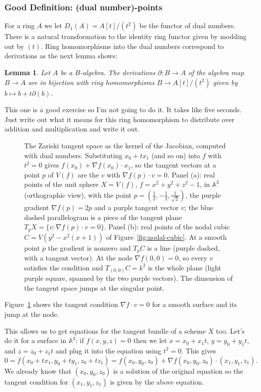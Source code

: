 \documentclass[12pt]{article}
\numberwithin{equation}{section}
\newtheorem{lemma}[theorem]{Lemma}
\theoremstyle{definition}
\theoremstyle{remark}
\renewcommand{\AA}{\mathbb{A}}
\begin{document}
\subsubsection{Good Definition: (dual number)-points}
For a ring $A$ we let $D_1(A) = A[t]/(t^2)$ be the functor of dual numbers. 
There is a natural transformation to the identity ring functor given by modding out by $(t)$. 
Ring homomorphisms into the dual numbers correspond to derivations as the next lemma shows:
\begin{lemma}
	Let $A$ be a $B$-algebra. 
	The derivations $\partial: B \to A$ of the algebra map $B \to A$ are in bijection with ring homomorphisms $B\to A[t]/(t^2)$ given by $b\mapsto b + t\partial(b)$.  
\end{lemma}
This one is a good exercise so I'm not going to do it. 
It takes like five seconds. 
Just write out what it means for this ring homomorphism to distribute over addition and multiplication and write it out.

\begin{figure}[H]
\centering

\caption{The Zariski tangent space as the kernel of the Jacobian, computed with dual numbers. Substituting $x_0+tx_1$ (and so on) into $f$ with $t^2=0$ gives $f(x_0)+\nabla f(x_0)\cdot x_1$, so the tangent vectors at a point $p$ of $V(f)$ are the $v$ with $\nabla f(p)\cdot v=0$. Panel (a): real points of the unit sphere $X=V(f)$, $f=x^2+y^2+z^2-1$, in $\AA^3$ (orthographic view), with the point $p=(\tfrac12,-\tfrac12,\tfrac1{\sqrt2})$, the purple gradient $\nabla f(p)=2p$ and a purple tangent vector $v$; the blue dashed parallelogram is a piece of the tangent plane $T_pX=\{v:\nabla f(p)\cdot v=0\}$. Panel (b): real points of the nodal cubic $C=V(y^2-x^2(x+1))$ of Figure~\ref{fig:nodal-cubic}. At a smooth point $p$ the gradient is nonzero and $T_pC$ is a line (purple dashed, with a tangent vector). At the node $\nabla f(0,0)=0$, so every $v$ satisfies the condition and $T_{(0,0)}C=k^2$ is the whole plane (light purple square, spanned by the two purple vectors). The dimension of the tangent space jumps at the singular point.}\label{fig:zariski-tangent-jumps}
\end{figure}
Figure~\ref{fig:zariski-tangent-jumps} shows the tangent condition $\nabla f\cdot v=0$ for a smooth surface and its jump at the node.

This allows us to get equations for the tangent bundle of a scheme $X$ too. 
Let's do it for a surface in $\AA^3$: if $f(x,y,z)=0$ then we let $x=x_0+x_1t$, $y=y_0+y_1t$, and $z=z_0+z_1 t$ and plug it into the equation using $t^2=0$. 
This gives
$$ 0=f(x_0+tx_1,y_0+ty_1,z_0+tz_1) = f(x_0,y_0,z_0) + \nabla f(x_0,y_0,z_0) \cdot (x_1,y_1,z_1).$$
We already know that $(x_0,y_0,z_0)$ is a solution of the original equation so the tangent condition for $(x_1,y_1,z_1)$ is given by the above equation.
\end{document}
